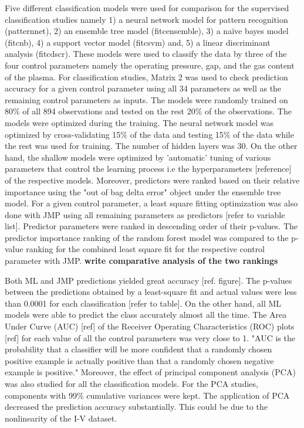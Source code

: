 \documentclass[12pt]{iopart}
\begin{document}
Five different classification models were used for comparison for the supervised classification studies namely 1) a neural network model for pattern recognition (patternnet), 2) an ensemble tree model (fitcensemble), 3) a naïve bayes model (fitcnb), 4) a support vector model (fitcsvm) and, 5) a linear discriminant analysis (fitcdscr). These models were used to classify the data by three of the four control parameters namely the operating pressure, gap, and the gas content of the plasma. For classification studies, Matrix 2 was used to check prediction accuracy for a given control parameter using all 34 parameters as well as the remaining control parameters as inputs. The models were randomly trained on 80\% of all 894 observations and tested on the rest 20\% of the observations. The models were optimized during the training. The neural network model was optimized by cross-validating 15\% of the data and testing 15\% of the data while the rest was used for training. The number of hidden layers was 30. On the other hand, the shallow models were optimized by 'automatic' tuning of various parameters that control the learning process i.e the hyperparameters [reference] of the respective models. Moreover, predictors were ranked based on their relative importance using the "out of bag delta error" object under the ensemble tree model. For a given control parameter, a least square fitting optimization was also done with JMP using all remaining parameters as predictors [refer to variable list]. Predictor parameters were ranked in descending order of their p-values. The predictor importance ranking of the random forest model was compared to the p-value ranking for the combined least square fit for the respective control parameter with JMP. \textbf{write comparative analysis of the two rankings}

Both ML and JMP predictions yielded great accuracy [ref. figure]. The p-values between the predictions obtained by a least-square fit and actual values were less than 0.0001 for each classification [refer to table]. On the other hand, all ML models were able to predict the class accurately almost all the time. The Area Under Curve (AUC) [ref] of the Receiver Operating Characteristics (ROC) plots [ref] for each value of all the control parameters was very close to 1. "AUC is the probability that a classifier will be more confident that a randomly chosen positive example is actually positive than that a randomly chosen negative example is positive." Moreover, the effect of principal component analysis (PCA) was also studied for all the classification models. For the PCA studies, components with 99\% cumulative variances were kept. The application of PCA decreased the prediction accuracy substantially. This could be due to the nonlinearity of the I-V dataset.
\end{document}
